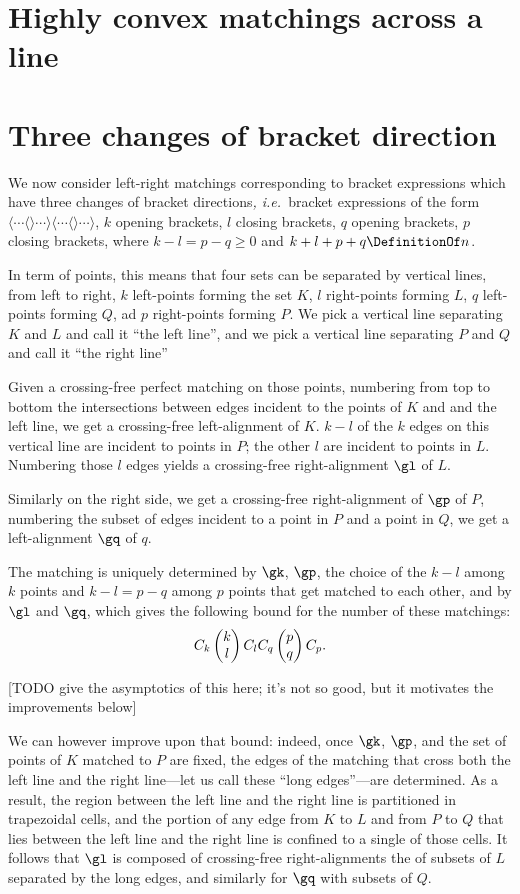 \documentclass[10pt, a4paper, twoside]{basestyle}
\newcommand{\idest}{\emph{, i.e.\ }}
\begin{document}
\section{Highly convex matchings across a line}
\section{Three changes of bracket direction}
We now consider left-right matchings corresponding to bracket expressions which have three
changes of bracket directions\idest bracket expressions of the form
$\langle\dotsb\langle\rangle\dotsb\rangle\langle\dotsb\langle\rangle\dotsb\rangle$,
$k$ opening brackets, $l$ closing brackets, $q$ opening brackets, $p$ closing brackets, where
$k-l=p-q\geq 0$ and $k+l+p+q\DefinitionOf n$.

In term of points, this means that four sets can be separated by vertical lines, from left
to right, $k$ left-points forming the set $K$, $l$ right-points forming $L$, $q$ left-points
forming $Q$, ad $p$ right-points forming $P$.
We pick a vertical line separating $K$ and $L$ and call it ``the left line'', and we pick
a vertical line separating $P$ and $Q$ and call it ``the right line''

Given a crossing-free perfect matching on those points, numbering from top to bottom the
intersections between edges incident to the points of $K$ and and the left line,
we get a crossing-free left-alignment of $K$. $k-l$ of the $k$ edges on this vertical
line are incident to points in $P$; the other $l$ are incident to points in $L$.
Numbering those $l$ edges yields a crossing-free right-alignment $\gl$ of $L$.

Similarly on the right side, we get a crossing-free right-alignment of $\gp$ of $P$,
numbering the subset of edges incident to a point in $P$ and a point in $Q$, we get a
left-alignment $\gq$ of $q$.

The matching is uniquely determined by $\gk$, $\gp$, the choice of
the $k-l$ among $k$ points and $k-l=p-q$ among $p$ points that get matched to each other,
and by $\gl$ and $\gq$, which gives the following bound for the number of these matchings:\[
C_k \binom k l C_l C_q \binom p q C_p\text.\]

[TODO give the asymptotics of this here; it's not so good, but it motivates the improvements below]

We can however improve upon that bound: indeed, once $\gk$, $\gp$, and the set of points
of $K$ matched to $P$ are fixed, the edges of the matching that cross both the left line
and the right line---let us call these ``long edges''---are determined. As a result,
the region between the left line and the
right line is partitioned in trapezoidal cells, and the portion of any edge from $K$ to $L$ and
from $P$ to $Q$ that lies between the left line and the right line is confined to a
single of those cells. It follows that $\gl$ is composed of crossing-free
right-alignments the of subsets of $L$ separated by the long edges, and similarly for $\gq$
with subsets of $Q$.
\end{document}
